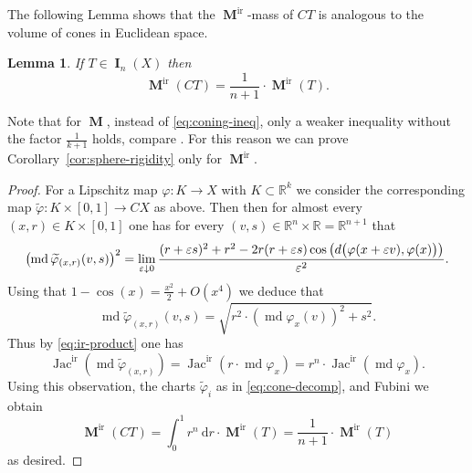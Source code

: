 \documentclass[reqno]{amsart}
\newtheorem{lemma}[theorem]{Lemma}
\numberwithin{equation}{section}
\newcommand{\Jac}{\operatorname{Jac}}
\newcommand{\md}{\operatorname{md}}
\DeclareMathOperator{\mass}{\mathbf{M}}
\DeclareMathOperator{\bI}{\mathbf{I}}
\DeclareMathOperator{\ir}{ir}
\begin{document}
The following Lemma shows that the $\mass^{\ir}$-mass of $CT$ is analogous to the volume of cones in Euclidean space.
\begin{lemma}
\label{lem:coning-ineq}
If $T\in \bI_n(X)$ then
\begin{equation}
\label{eq:coning-ineq}
    \mass^{\ir}(CT)=\frac{1}{n+1}\cdot \mass^{\ir}(T).
\end{equation}
\end{lemma}
Note that for $\mass$, instead of \eqref{eq:coning-ineq}, only a weaker inequality without the factor $\frac{1}{k+1}$ holds, compare \cite[Lemma~3.5]{basso2021undistorted}. For this reason we can prove Corollary~\ref{cor:sphere-rigidity} only for $\mass^{\ir}$.
\begin{proof}
For a Lipschitz map $\varphi \colon K \to X$ with $K\subset \mathbb{R}^k$ we consider the corresponding map $\widetilde{\varphi}\colon K\times [0,1]\to CX$ as above. Then then for almost every $(x,r)\in K\times [0,1]$ one has for every $(v,s)\in \mathbb{R}^n\times\mathbb{R}=\mathbb{R}^{n+1}$ that 
\begin{equation}
    \big(\hspace{-0.2em}\md \widetilde{\varphi}_{(x,r)}(v,s)\big)^2
    =\lim_{\varepsilon\downarrow 0}  \frac{(r+\varepsilon s)^2+r^2-2r(r+\varepsilon s)\cos\big( d\big(\varphi(x+\varepsilon v),\varphi(x)\big)\big)}{\varepsilon^2}.
\end{equation}
Using that \(1-\cos(x)=\frac{x^2}{2}+O(x^4)\) we deduce that
\[
 \md \widetilde{\varphi}_{(x,r)}(v,s)=\sqrt{r^2\cdot \left(\md \varphi_x(v)\right)^2+s^2}.
\]
Thus by \eqref{eq:ir-product} one has 
\begin{equation}
    \Jac^{\ir}(\md \widetilde{\varphi}_{(x,r)})=\Jac^{\ir}(r\cdot \md \varphi_x)=r^{n}\cdot\Jac^{\ir}(\md \varphi_x).
\end{equation}
Using this observation, the charts $\widetilde{\varphi}_i$ as in \eqref{eq:cone-decomp}, and Fubini we obtain
\begin{equation}
    \mass^{\ir}(CT)=\int_0^1 r^n\ \textrm{d}r\cdot \mass^{\ir}(T)=\frac{1}{n+1}\cdot \mass^{\ir}(T)
\end{equation}
as desired.
\end{proof}
\end{document}
